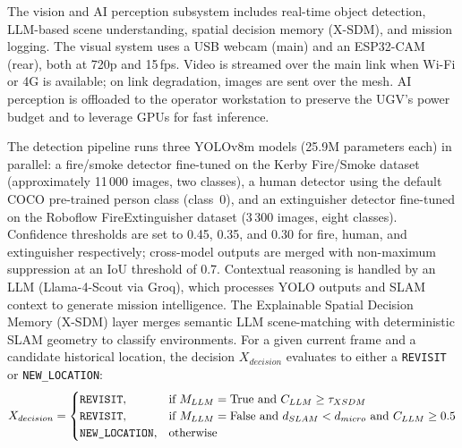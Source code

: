 The vision and AI perception subsystem includes real-time object detection, LLM-based scene understanding, spatial decision memory (X-SDM), and mission logging. The visual system uses a USB webcam (main) and an ESP32-CAM (rear), both at 720p and 15\,fps. Video is streamed over the main link when Wi-Fi or 4G is available; on link degradation, images are sent over the mesh. AI perception is offloaded to the operator workstation to preserve the UGV's power budget and to leverage GPUs for fast inference.

The detection pipeline runs three YOLOv8m \cite{jocher2023yolov8} models (25.9M parameters each) in parallel: a fire/smoke detector fine-tuned on the Kerby Fire/Smoke dataset \cite{kerby2024firesmoke} (approximately 11\,000 images, two classes), a human detector using the default COCO pre-trained person class (class~0), and an extinguisher detector fine-tuned on the Roboflow FireExtinguisher dataset \cite{fireextinguisher2022roboflow} (3\,300 images, eight classes). Confidence thresholds are set to 0.45, 0.35, and 0.30 for fire, human, and extinguisher respectively; cross-model outputs are merged with non-maximum suppression at an IoU threshold of 0.7. Contextual reasoning is handled by an LLM (Llama-4-Scout via Groq), which processes YOLO outputs and SLAM context to generate mission intelligence. The Explainable Spatial Decision Memory (X-SDM) layer merges semantic LLM scene-matching with deterministic SLAM geometry to classify environments. For a given current frame and a candidate historical location, the decision $X_{decision}$ evaluates to either a \texttt{REVISIT} or \texttt{NEW\_LOCATION}:
\begin{equation}
X_{decision} = 
\begin{cases} 
\text{\texttt{REVISIT}}, & \text{if } M_{LLM} = \text{True} \text{ and } C_{LLM} \ge \tau_{XSDM} \\
\text{\texttt{REVISIT}}, & \text{if } M_{LLM} = \text{False} \text{ and } d_{SLAM} < d_{micro} \text{ and } C_{LLM} \ge 0.5 \\
\text{\texttt{NEW\_LOCATION}}, & \text{otherwise}
\end{cases}
\label{eq:xsdm_decision}
\end{equation}
